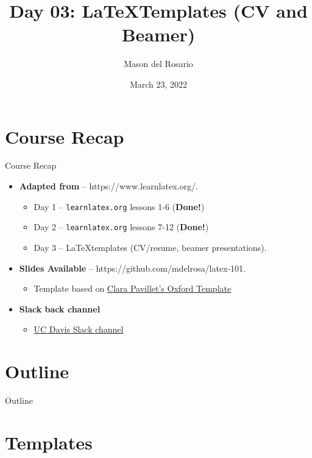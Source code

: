 \documentclass{beamer}
\title{Day 03: \LaTeX \;Templates (CV and Beamer)}
\author{\small{Mason del Rosario}}
\institute{\LaTeX 101}
\date{March 23, 2022} %
\begin{document}
\footnotesize{
% 


{ 
\frame{\titlepage}}

  \section*{Course Recap}

  \begin{frame}{Course Recap}
    \begin{itemize} 
      \item \textbf{Adapted from} -- https://www.learnlatex.org/. 
        \begin{itemize}
          \item Day 1 -- \texttt{learnlatex.org} lessons 1-6 (\textbf{Done!})
          \item Day 2 -- \texttt{learnlatex.org} lessons 7-12 (\textbf{Done!})
          \item Day 3 -- \LaTeX templates (CV/resume, beamer presentations).
        \end{itemize}
      \item \textbf{Slides Available} -- https://github.com/mdelrosa/latex-101.
      \begin{itemize}
        \item Template based on \href{https://www.overleaf.com/latex/templates/oxpav/xnjgrxthvjhg}{Clara Pavillet's Oxford Template}
      \end{itemize}
      \item \textbf{Slack back channel}
      \begin{itemize}
        \item \href{https://join.slack.com/share/zt-ul82okyc-SI2GftuwPx_lFyBXll9rjw}{UC Davis Slack channel}
      \end{itemize}
    \end{itemize}
  \end{frame}

  \section*{Outline}\begin{frame}{Outline}\tableofcontents\end{frame}

  \section{Templates}

}
\end{document}
